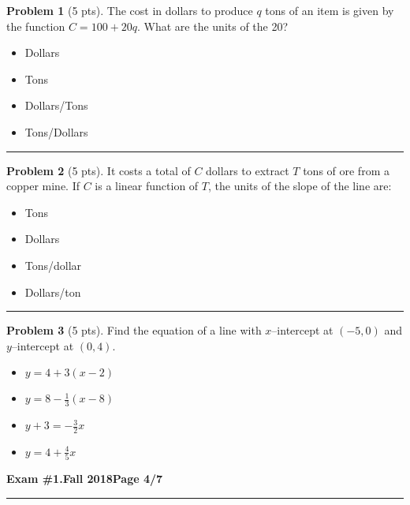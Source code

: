 \documentclass[12pt]{article}
\makeatletter
\theoremstyle{definition}
\newtheorem{problem}{Problem}
\newcommand*{\radiobutton}{%
  \@ifstar{\@radiobutton0}{\@radiobutton1}%
}
\newcommand*{\@radiobutton}[1]{%
  \begin{tikzpicture}
    \pgfmathsetlengthmacro\radius{height("X")/2}
    \draw[radius=\radius] circle;
    \ifcase#1 \fill[radius=.6*\radius] circle;\fi
  \end{tikzpicture}%
}
\makeatother
\begin{document}
\begin{problem}[5 pts]
  The cost in dollars to produce $q$ tons of an item is given by the function $C = 100 + 20q$. What are the units of
  the 20? 
  \begin{itemize}
  \item[\radiobutton] Dollars
  \item[\radiobutton] Tons
  \item[\radiobutton] Dollars/Tons
  \item[\radiobutton] Tons/Dollars
  \end{itemize} 
\end{problem}
\hrule

\begin{problem}[5 pts]
  It costs a total of $C$ dollars to extract $T$ tons of ore from a copper mine. If $C$ is a linear function of $T$, the
  units of the slope of the line are: 
  \begin{itemize}
  \item[\radiobutton] Tons
  \item[\radiobutton] Dollars
  \item[\radiobutton] Tons/dollar
  \item[\radiobutton] Dollars/ton
  \end{itemize}
\end{problem}
\hrule

\begin{problem}[5 pts]
  Find the equation of a line with $x$--intercept at $(-5,0)$ and $y$--intercept at $(0,4)$.
  \begin{itemize}
  \item[\radiobutton] $y=4+3(x-2)$
  \item[\radiobutton] $y=8-\tfrac{1}{3}(x-8)$
  \item[\radiobutton] $y+3=-\tfrac{3}{2}x$
  \item[\radiobutton] $y=4+\tfrac{4}{5}x$
  \end{itemize}
\end{problem}
\newpage

\hfill{\large\bf Exam \#1.}\hfill{\large\bf Fall 2018}\hfill{\large\bf Page 4/7}\hrule
\end{document}
